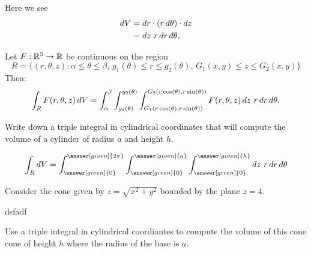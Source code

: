\documentclass{ximera}
\begin{document}
\begin{image}
  \end{image}
Here we see 
\begin{align*}
\mathop{}\!d V &= \mathop{}\!d r \cdot (r \mathop{}\!d \theta)\cdot \mathop{}\!d z \\
&= \mathop{}\!d z\ r \mathop{}\!d r \mathop{}\!d \theta.
\end{align*}
\begin{theorem}
  Let $F:\mathbb R^3\to\mathbb R$ be continuous on the region
  \[
  R=\{(r,\theta,z):\text{$\alpha\leq\theta\leq\beta$, $g_1(\theta)\leq r\leq g_2(\theta)$, $G_1(x,y)\le z\le G_2(x,y)$}\}
  \]
  Then: 
  \[
  \int_R F(r,\theta,z)\mathop{}\!d V = \int_\alpha^\beta\int_{g_1(\theta)}^{g_2(\theta)} \int_{G_1(r\cos(\theta),r\sin(\theta))}^{G_2(r\cos(\theta),r\sin(\theta))}F(r,\theta,z) \mathop{}\!d z \ r\mathop{}\!d r\mathop{}\!d \theta.
  \]
\end{theorem}

\begin{question}
  Write down a triple integral in cylindrical coordinates that will
  compute the volume of a cylinder of radius $a$ and height $h$.
  \begin{prompt}
  \[
  \int_R \d V = \int_{\answer[given]{0}}^{\answer[given]{2\pi}}
  \int_{\answer[given]{0}}^{\answer[given]{a}}
  \int_{\answer[given]{0}}^{\answer[given]{h}}
  \d z \ r \d r \d \theta 
  \]
  \end{prompt}
\end{question}


\begin{example}
  Consider the cone given by $z = \sqrt{x^2 + y^2}$ bounded by the
  plane $z=4$.
  \begin{image}
    dsfadf
  \end{image}
  Use a triple integral in cylindrical coordiantes to compute the
  volume of this cone cone of height $h$ where the radius of the base is $a$.
\end{example}

\begin{example}
  
\end{example}
\end{document}
